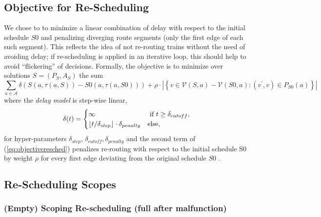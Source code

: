 \documentclass{article}
\DeclarePairedDelimiter{\floor}{\lfloor}{\rfloor}
\begin{document}
\subsection{Objective for Re-Scheduling}
We chose to to minimize a linear combination of delay with respect to the initial schedule $S0$ and penalizing diverging route segments (only the first edge of each such segment). This reflects the idea of not re-routing trains without the need of avoiding delay; if re-scheduling is applied in an iterative loop, this should help to avoid ``flickering'' of decisions.
%
Formally, the objective is to minimize over solutions $S=(P_S,A_S)$  the sum
\begin{equation}
\sum_{a \in \mathcal{A}} \delta\left(S(a,\tau(a,S)) - S0(a,\tau(a, S0))\right) + \rho \cdot \left|\left\{v \in \mathcal{V}(S,a)-\mathcal{V}(S0,a): (v^\prime,v) \in P_{S0}(a) \right\}\right| \label{eq:objectiveresched}
\end{equation}
where the \emph{delay model} is step-wise linear,
\begin{equation}
\delta(t) =
\begin{cases}
    \infty & \textrm{ if } t \geq \delta_{cutoff},\\
    \floor{t / \delta_{step}} \cdot \delta_{penalty}  & \textrm{else},
\end{cases}
\end{equation}
for hyper-parameters $\delta_{step}$, $\delta_{cutoff}, \delta_{penalty}$
and the second term of (\ref{eq:objectiveresched}) penalizes re-routing with respect to the initial schedule S0 by weight $\rho$ for every first edge deviating from the original schedule $S0$ .


\subsection{Re-Scheduling Scopes}



\subsubsection{(Empty) Scoping Re-scheduling (full after malfunction)}\label{subsubsec:Delta0}
\end{document}
